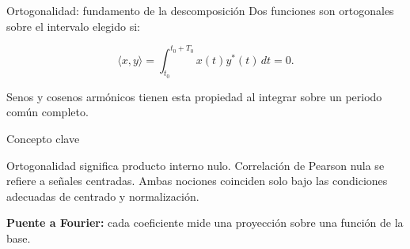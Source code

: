\documentclass[
  10pt,
  ignorenonframetext,
  aspectratio=169,
  spanish,
]{beamer}
\begin{document}
\begin{frame}{Ortogonalidad: fundamento de la descomposición}
\label{d1-073}
Dos funciones son ortogonales sobre el intervalo elegido si:

\[\langle x,y\rangle=\int_{t_0}^{t_0+T_0}x(t)y^*(t)\,dt=0.\]

Senos y cosenos armónicos tienen esta propiedad al integrar sobre un
periodo común completo.

\begin{block}{Concepto clave}

Ortogonalidad significa producto interno nulo. Correlación de Pearson
nula se refiere a señales centradas. Ambas nociones coinciden solo bajo
las condiciones adecuadas de centrado y normalización.

\end{block}

\textbf{Puente a Fourier:} cada coeficiente mide una proyección sobre
una función de la base.

\end{frame}
\end{document}
